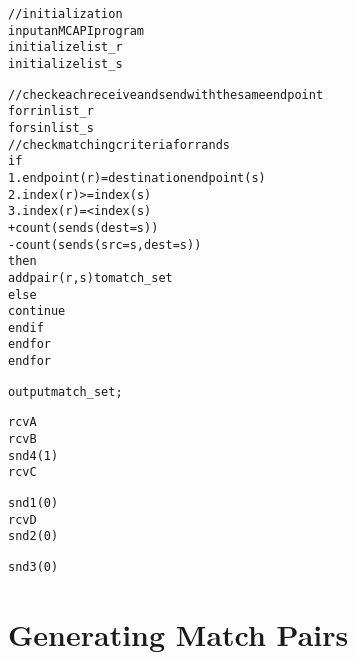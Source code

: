 
\newsavebox{\boxalgorithm}
\begin{lrbox}{\boxalgorithm}
\begin{minipage}[c]{1.4\linewidth}
\begin{alltt}
// initialization
input an MCAPI program
initialize list_r
initialize list_s

// check each receive and send with the same endpoint
for r in list_r
  for s in list_s
    // check matching criteria for r and s
    if
      1. endpoint(r) = destination endpoint(s)
      2. index(r) >= index(s)
      3. index(r) =< index(s) 
                     + count(sends(dest=s))
                     - count(sends(src=s, dest=s))
    then
      add pair (r, s) to match_set
    else
      continue
    end if
  end for
end for

output match_set;
\end{alltt}
\end{minipage}
\end{lrbox}

\newsavebox{\boxtaskzero}
\begin{lrbox}{\boxtaskzero}
\begin{minipage}[t]{0.2\linewidth}
\begin{alltt}
rcvA
rcvB
snd4(1)
rcvC
\end{alltt}
\end{minipage}
\end{lrbox}

\newsavebox{\boxtaskone}
\begin{lrbox}{\boxtaskone}
\begin{minipage}[t]{0.2\linewidth}
\begin{alltt}
snd1(0)
rcvD
snd2(0)
\end{alltt}
\end{minipage}
\end{lrbox}

\newsavebox{\boxtasktwo}
\begin{lrbox}{\boxtasktwo}
\begin{minipage}[t]{0.2\linewidth}
\begin{alltt}
snd3(0)
\end{alltt}
\end{minipage}
\end{lrbox}

\section{Generating Match Pairs}


